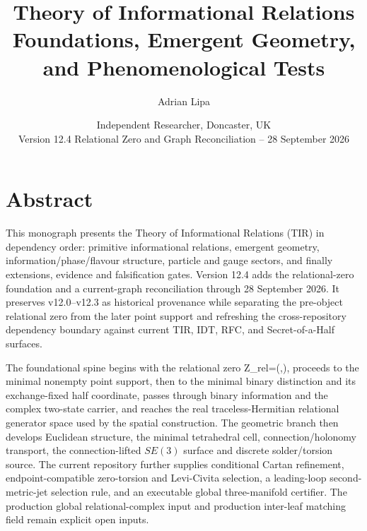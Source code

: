 \documentclass[11pt,a4paper,twoside]{book}
\def\({}%
\def\){}%
\theoremstyle{definition}
\begin{document}
\raggedbottom
\frontmatter
\title{Theory of Informational Relations\\\large Foundations, Emergent Geometry, and Phenomenological Tests}
\author{Adrian Lipa}
\date{Independent Researcher, Doncaster, UK\\Version 12.4 Relational Zero and Graph Reconciliation -- 28 September 2026}
\maketitle

\chapter*{Abstract}

This monograph presents the Theory of Informational Relations (TIR) in dependency order: primitive informational relations, emergent geometry, information/phase/flavour structure, particle and gauge sectors, and finally extensions, evidence and falsification gates. Version 12.4 adds the relational-zero foundation and a current-graph reconciliation through 28 September 2026. It preserves v12.0--v12.3 as historical provenance while separating the pre-object relational zero from the later point support and refreshing the cross-repository dependency boundary against current TIR, IDT, RFC, and Secret-of-a-Half surfaces.

The foundational spine begins with the relational zero \(\mathfrak Z_{\rm rel}=(\varnothing,\varnothing)\), proceeds to the minimal nonempty point support, then to the minimal binary distinction and its exchange-fixed half coordinate, passes through binary information and the complex two-state carrier, and reaches the real traceless-Hermitian relational generator space used by the spatial construction. The geometric branch then develops Euclidean structure, the minimal tetrahedral cell, connection/holonomy transport, the connection-lifted $SE(3)$ surface and discrete solder/torsion source. The current repository further supplies conditional Cartan refinement, endpoint-compatible zero-torsion and Levi-Civita selection, a leading-loop second-metric-jet selection rule, and an executable global three-manifold certifier. The production global relational-complex input and production inter-leaf matching field remain explicit open inputs.
\end{document}
